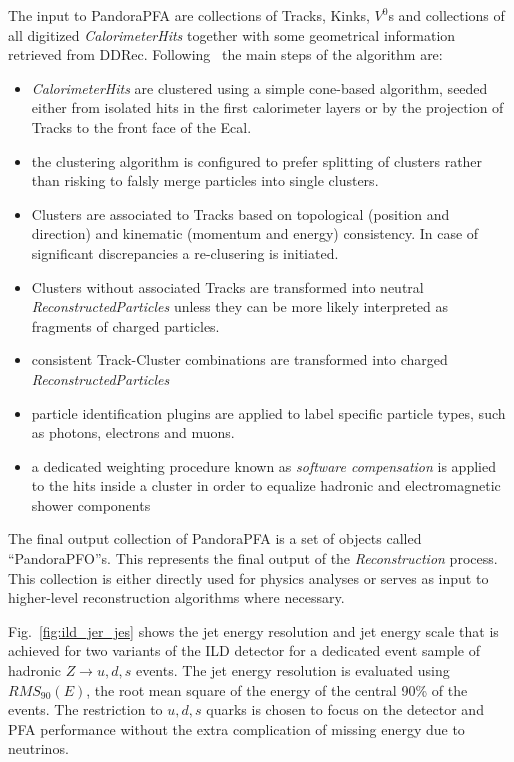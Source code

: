The input to PandoraPFA are collections of Tracks, Kinks, $V^0$s and collections of all digitized \emph{CalorimeterHits} together with
some geometrical information retrieved from DDRec.
Following~\cite{Marshall:2015rfa} the main steps of the algorithm are:

\begin{itemize}
\item \emph{CalorimeterHits} are clustered using a simple cone-based algorithm, seeded either from isolated hits in the first calorimeter
  layers or by the projection of Tracks to the front face of the Ecal.

\item the clustering algorithm is configured to prefer splitting of clusters rather than risking to falsly merge particles into single
  clusters.

\item Clusters are associated to Tracks based on topological (position and direction) and kinematic (momentum and energy) consistency.
  In case of significant discrepancies a re-clusering is initiated.

\item Clusters without associated Tracks are transformed into neutral \emph{ReconstructedParticles} unless they can be more likely
  interpreted as fragments of charged particles.
  
\item consistent Track-Cluster combinations are transformed into charged \emph{ReconstructedParticles}
  
\item particle identification plugins are applied to label specific particle types, such as photons, electrons and muons.

\item a dedicated weighting procedure known as \emph{software compensation} is applied to the hits inside a cluster in order
  to equalize hadronic and electromagnetic shower components 
  
\end{itemize}


The final output collection of PandoraPFA is a set of objects called
``PandoraPFO''s.  This represents the final output of the \emph{Reconstruction}
process. This collection is either directly used for physics analyses or serves as input to higher-level reconstruction
algorithms where necessary.

Fig.~\ref{fig:ild_jer_jes} shows the jet energy resolution and jet energy scale that is achieved for two variants of the ILD detector
for a dedicated event sample of hadronic $Z\rightarrow u,d,s$ events.
The jet energy resolution is evaluated using $RMS_{90}(E)$, the root mean square of the energy of the central 90\% of the events.
The restriction to $u,d,s$ quarks is chosen to focus on  the detector and PFA performance without the extra complication of missing
energy due to neutrinos.

